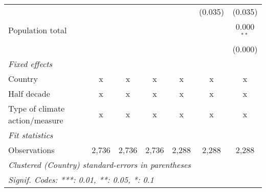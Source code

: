 \begin{tabular}{lcccccc}
                                                    &               &               &               &               & (0.035)       & (0.035)\\   
   Population total                                 &               &               &               &               &               & 0.000$^{**}$\\   
                                                    &               &               &               &               &               & (0.000)\\   
   \emph{Fixed effects}\\
   Country                                          & x             & x             & x             & x             & x             & x\\  
   Half decade                                      & x             & x             & x             & x             & x             & x\\  
   Type of climate action/measure                   & x             & x             & x             & x             & x             & x\\  
   \midrule \emph{Fit statistics}\\
   Observations                                     & 2,736         & 2,736         & 2,736         & 2,288         & 2,288         & 2,288\\  
   \midrule
   \multicolumn{7}{l}{\emph{Clustered (Country) standard-errors in parentheses}}\\
   \multicolumn{7}{l}{\emph{Signif. Codes: ***: 0.01, **: 0.05, *: 0.1}}\\
\end{tabular}
\par\endgroup


